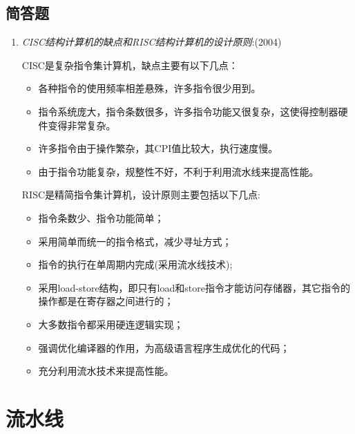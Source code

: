 \documentclass[a4paper]{ctexbook}
\begin{document}
\section{简答题}
\begin{enumerate}
  \item {\color{grey}\emph{CISC结构计算机的缺点和RISC结构计算机的设计原则}:(2004)
  
    CISC是复杂指令集计算机，缺点主要有以下几点：
    \begin{itemize}
      \item 各种指令的使用频率相差悬殊，许多指令很少用到。
      \item 指令系统庞大，指令条数很多，许多指令功能又很复杂，这使得控制器硬件变得非常复杂。
      \item 许多指令由于操作繁杂，其CPI值比较大，执行速度慢。
      \item 由于指令功能复杂，规整性不好，不利于利用流水线来提高性能。
    \end{itemize}
    
    RISC是精简指令集计算机，设计原则主要包括以下几点:
    \begin{itemize}
      \item 指令条数少、指令功能简单；
      \item 采用简单而统一的指令格式，减少寻址方式；
      \item 指令的执行在单周期内完成(采用流水线技术);
      \item 采用load-store结构，即只有load和store指令才能访问存储器，其它指令的操作都是在寄存器之间进行的；
      \item 大多数指令都采用硬连逻辑实现；
      \item 强调优化编译器的作用，为高级语言程序生成优化的代码；
      \item 充分利用流水技术来提高性能。
    \end{itemize}
  }
\end{enumerate}

\newpage
\chapter{流水线}
\end{document}
